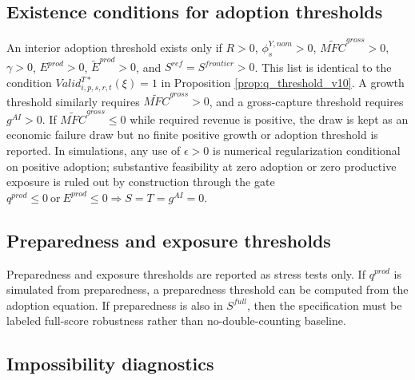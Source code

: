\documentclass[11pt,a4paper]{article}
\begin{document}
\subsection{Existence conditions for adoption thresholds}\label{subsec:adoption_threshold_existence}

An interior adoption threshold exists only if $R>0$, $\phi^{Y,nom}_s>0$, $\widetilde{MFC}^{gross}>0$, $\gamma>0$, $E^{prod}>0$, $\tilde E^{prod}>0$, and $S^{ref}=S^{frontier}>0$. This list is identical to the condition $Valid^{T*}_{i,p,s,r,t}(\xi)=1$ in Proposition \ref{prop:q_threshold_v10}. A growth threshold similarly requires $\widetilde{MFC}^{gross}>0$, and a gross-capture threshold requires $g^{AI}>0$. If $\widetilde{MFC}^{gross}\leq0$ while required revenue is positive, the draw is kept as an economic failure draw but no finite positive growth or adoption threshold is reported. In simulations, any use of $\epsilon>0$ is numerical regularization conditional on positive adoption; substantive feasibility at zero adoption or zero productive exposure is ruled out by construction through the gate $q^{prod}\leq0\ \text{or}\ E^{prod}\leq0\Rightarrow S=T=g^{AI}=0$.

\subsection{Preparedness and exposure thresholds}

Preparedness and exposure thresholds are reported as stress tests only. If $q^{prod}$ is simulated from preparedness, a preparedness threshold can be computed from the adoption equation. If preparedness is also in $S^{full}$, then the specification must be labeled full-score robustness rather than no-double-counting baseline.

\subsection{Impossibility diagnostics}
\end{document}
